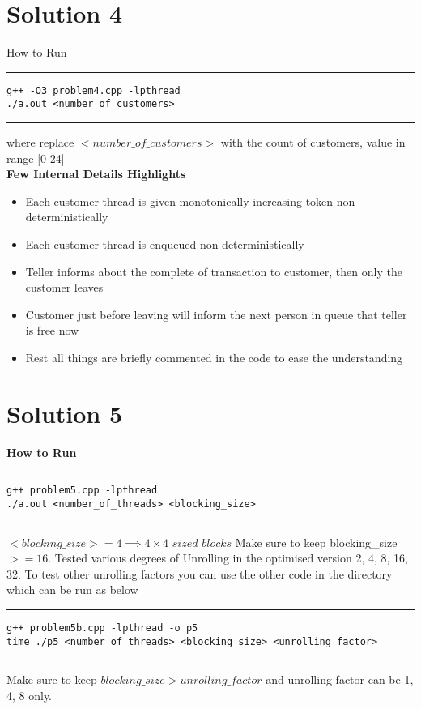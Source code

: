 \documentclass[a4paper]{article}
\begin{document}
\section{Solution 4}

How to Run \\
\hrule
\begin{lstlisting}
g++ -O3 problem4.cpp -lpthread
./a.out <number_of_customers>
\end{lstlisting}
\hrule 
\vspace{0.5cm}
where replace $<number\_of\_customers>$ with the count of customers, value in range [0 24] \\ 
\newline
\newline
{\bf Few Internal Details Highlights}
\begin{itemize}
\item Each customer thread is given monotonically increasing token non-deterministically
\item Each customer thread is enqueued non-deterministically
\item Teller informs about the complete of transaction to customer, then only the customer leaves 
\item Customer just before leaving will inform the next person in queue that teller is free now
\item Rest all things are briefly commented in the code to ease the understanding
\end{itemize}


\section{Solution 5}

{\bf How to Run} \\
\hrule
\begin{lstlisting}
g++ problem5.cpp -lpthread
./a.out <number_of_threads> <blocking_size>
\end{lstlisting}
\hrule 
\vspace{0.5cm}
$ <blocking\_size> = 4 \implies 4 \times 4 \,\, sized \,\, blocks $ Make sure to keep blocking\_size $>= 16$.
\newline \newline
Tested various degrees of Unrolling in the optimised version 2, 4, 8, 16, 32. To test other unrolling factors you can use the other code in the directory which can be run as below
\vspace{0.5cm}
\hrule
\begin{lstlisting}
g++ problem5b.cpp -lpthread -o p5
time ./p5 <number_of_threads> <blocking_size> <unrolling_factor>
\end{lstlisting}
\hrule 
\vspace{0.5cm}
Make sure to keep $blocking\_size > unrolling\_factor$ and unrolling factor can be 1, 4, 8 only.
\newpage
\end{document}
